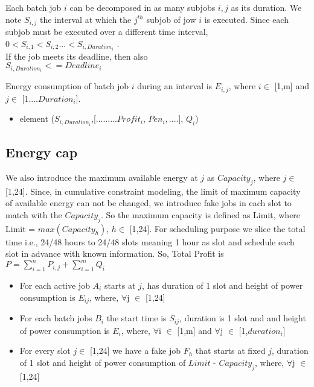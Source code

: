 \documentclass[a4paper]{article}
\begin{document}
Each batch job $i$ can be decomposed in as many subjobs $i,j$ as its duration. We note $S_{i,j}$ the interval at which the $j^{th}$ subjob of jow $i$ is executed.
Since each subjob must be executed over a different time interval,\\
$0< S_{i,1}<S_{i,2}$...$<S_{i,Duration_i}$ .\\
If the job meets its deadline, then also\\
$S_{i,Duration_i}<=Deadline_i$

Energy consumption of batch job $i$ during an interval is $E_{i,j}$, where $i\in$ [1,m] and $j\in$ [1....$Duration_i$]. 
\begin{itemize}
 \item element ($S_{i,Duration_i}$,[.........$Profit_i$, $Pen_i,....$], $Q_i$)
\end{itemize}

\subsection{Energy cap}

We also introduce the maximum available energy at $j$ as $Capacity_j$, where $j\in$ [1,24]. Since, in cumulative constraint modeling, the limit of maximum capacity of available energy can not be changed, we introduce fake jobs in each slot to match with the $Capacity_j$. So the maximum capacity is defined as Limit, where Limit = $max (Capacity_{h})$, ${h}\in$ [1,24]. For scheduling purpose we slice the total time i.e., 24/48 hours to 24/48 slots meaning 1 hour as slot and schedule each slot in advance with known information. So, Total Profit is $P=\sum_{i=1}^{n} {P_{i,j}} + \sum_{i=1}^{m} {Q_i}$
 
\begin{itemize}
\item For each active job $A_{i}$ starts at $j$, has duration of 1 slot and height of power consumption is $E_{ij}$, where, $\forall$j $\in$ [1,24]
\end{itemize}

\begin{itemize}
\item For each batch jobs $B_{i}$ the start time is $S_{ij}$, duration is 1 slot and and height of power consumption is $E_{i}$, where, $\forall$i $\in$ [1,m] and $\forall$j $\in$ [1,$duration_i$]
\end{itemize}

\begin{itemize}
\item  For every slot ${j}\in$ [1,24] we have a fake job $F_{h}$ that starts at fixed $j$, duration of 1 slot and height of power consumption of $Limit$ - $Capacity_j$, where, $\forall$j $\in$ [1,24]
\end{itemize}
\end{document}
